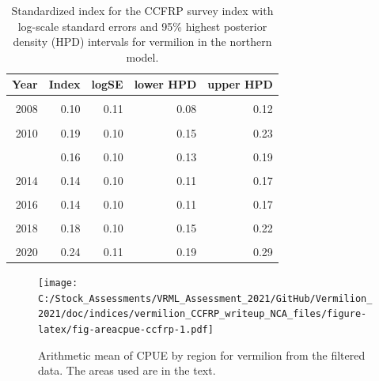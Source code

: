 \documentclass[11pt,
  english,
]{article}
\begin{document}
\begin{table}

\caption{\label{tab:tab-index-ccfrp}Standardized index for the CCFRP survey index with log-scale standard errors and 95\% highest
       posterior density (HPD) intervals for vermilion in the northern model.}
\centering
\begin{tabular}[t]{rrrrr}
\toprule
Year & Index & logSE & lower HPD & upper HPD\\
\midrule
\cellcolor{gray!6}{2007} & \cellcolor{gray!6}{0.11} & \cellcolor{gray!6}{0.13} & \cellcolor{gray!6}{0.09} & \cellcolor{gray!6}{0.14}\\
2008 & 0.10 & 0.11 & 0.08 & 0.12\\
\cellcolor{gray!6}{2009} & \cellcolor{gray!6}{0.16} & \cellcolor{gray!6}{0.11} & \cellcolor{gray!6}{0.13} & \cellcolor{gray!6}{0.19}\\
2010 & 0.19 & 0.10 & 0.15 & 0.23\\
\cellcolor{gray!6}{2011} & \cellcolor{gray!6}{0.16} & \cellcolor{gray!6}{0.10} & \cellcolor{gray!6}{0.13} & \cellcolor{gray!6}{0.19}\\
\addlinespace
2012 & 0.16 & 0.10 & 0.13 & 0.19\\
\cellcolor{gray!6}{2013} & \cellcolor{gray!6}{0.08} & \cellcolor{gray!6}{0.12} & \cellcolor{gray!6}{0.06} & \cellcolor{gray!6}{0.10}\\
2014 & 0.14 & 0.10 & 0.11 & 0.17\\
\cellcolor{gray!6}{2015} & \cellcolor{gray!6}{0.19} & \cellcolor{gray!6}{0.13} & \cellcolor{gray!6}{0.14} & \cellcolor{gray!6}{0.24}\\
2016 & 0.14 & 0.10 & 0.11 & 0.17\\
\addlinespace
\cellcolor{gray!6}{2017} & \cellcolor{gray!6}{0.14} & \cellcolor{gray!6}{0.10} & \cellcolor{gray!6}{0.11} & \cellcolor{gray!6}{0.17}\\
2018 & 0.18 & 0.10 & 0.15 & 0.22\\
\cellcolor{gray!6}{2019} & \cellcolor{gray!6}{0.22} & \cellcolor{gray!6}{0.10} & \cellcolor{gray!6}{0.18} & \cellcolor{gray!6}{0.26}\\
2020 & 0.24 & 0.11 & 0.19 & 0.29\\
\bottomrule
\end{tabular}
\end{table}

\FloatBarrier

\begin{figure}
\centering
\texttt{[image: C:/Stock\_Assessments/VRML\_Assessment\_2021/GitHub/Vermilion\_2021/doc/indices/vermilion\_CCFRP\_writeup\_NCA\_files/figure-latex/fig-areacpue-ccfrp-1.pdf]}
\caption{\label{fig:fig-areacpue-ccfrp}Arithmetic mean of CPUE by region for vermilion from the filtered data. The areas used are in the text.}
\end{figure}
\end{document}
